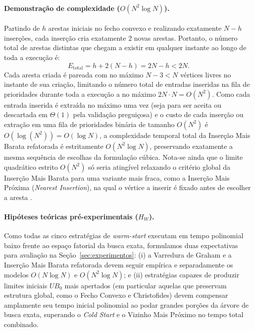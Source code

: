 \paragraph{Demonstração de complexidade ($O(N^2 \log N)$).}
Partindo de $h$ arestas iniciais no fecho convexo e realizando exatamente $N - h$ inserções,
cada inserção cria exatamente $2$ novas arestas. Portanto, o número total de arestas distintas
que chegam a existir em qualquer instante ao longo de toda a execução é:
\begin{equation}
  E_{\text{total}} = h + 2(N - h) = 2N - h < 2N.
\end{equation}
Cada aresta criada é pareada com no máximo $N - 3 < N$ vértices livres no instante de sua
criação, limitando o número total de entradas inseridas na fila de prioridades durante toda a
execução a no máximo $2N \cdot N = O(N^2)$. Como cada entrada inserida é extraída no máximo uma
vez (seja para ser aceita ou descartada em $\Theta(1)$ pela validação preguiçosa) e o custo de
cada inserção ou extração em uma fila de prioridades binária de tamanho $O(N^2)$ é
$O(\log(N^2)) = O(\log N)$, a complexidade temporal total da Inserção Mais Barata refatorada é
estritamente \textbf{$O(N^2 \log N)$}, preservando exatamente a mesma sequência de escolhas da
formulação cúbica. Nota-se ainda que o limite quadrático estrito $O(N^2)$ só seria atingível
relaxando o critério global da Inserção Mais Barata para uma variante mais fraca, como a
Inserção Mais Próxima (\textit{Nearest Insertion}), na qual o vértice a inserir é fixado antes
de escolher a aresta \cite{rosenkrantz1977analysis}.

\paragraph{Hipóteses teóricas pré-experimentais ($H_W$).}
Como todas as cinco estratégias de \textit{warm-start} executam em tempo polinomial baixo frente
ao espaço fatorial da busca exata, formulamos duas expectativas para avaliação na
Seção~\ref{sec:experimentos}: (i) a Varredura de Graham e a Inserção Mais Barata refatorada
devem seguir empírica e separadamente os modelos $O(N \log N)$ e $O(N^2 \log N)$; e (ii)
estratégias capazes de produzir limites iniciais $UB_0$ mais apertados (em particular aquelas
que preservam estrutura global, como o Fecho Convexo e Christofides) devem compensar amplamente
seu tempo inicial polinomial ao podar grandes porções da árvore de busca exata, superando o
\textit{Cold Start} e o Vizinho Mais Próximo no tempo total combinado.
